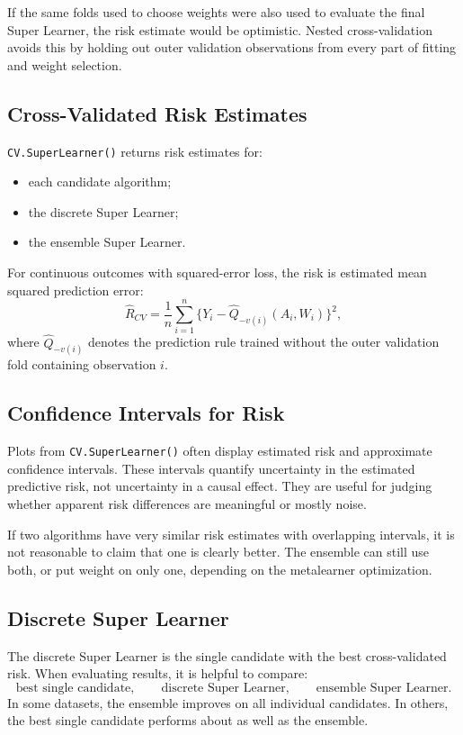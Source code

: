 If the same folds used to choose weights were also used to evaluate the final Super
Learner, the risk estimate would be optimistic. Nested cross-validation avoids this by
holding out outer validation observations from every part of fitting and weight
selection.

\subsection{Cross-Validated Risk Estimates}

\texttt{CV.SuperLearner()} returns risk estimates for:
\begin{itemize}
\item each candidate algorithm;
\item the discrete Super Learner;
\item the ensemble Super Learner.
\end{itemize}

For continuous outcomes with squared-error loss, the risk is estimated mean squared
prediction error:
\[
\widehat R_{CV}
=
\frac{1}{n}\sum_{i=1}^n
\{Y_i-\hat Q_{-v(i)}(A_i,W_i)\}^2,
\]
where $\hat Q_{-v(i)}$ denotes the prediction rule trained without the outer validation
fold containing observation $i$.

\subsection{Confidence Intervals for Risk}

Plots from \texttt{CV.SuperLearner()} often display estimated risk and approximate
confidence intervals. These intervals quantify uncertainty in the estimated predictive
risk, not uncertainty in a causal effect. They are useful for judging whether apparent
risk differences are meaningful or mostly noise.

If two algorithms have very similar risk estimates with overlapping intervals, it is not
reasonable to claim that one is clearly better. The ensemble can still use both, or put
weight on only one, depending on the metalearner optimization.

\subsection{Discrete Super Learner}

The discrete Super Learner is the single candidate with the best cross-validated risk.
When evaluating results, it is helpful to compare:
\[
\text{best single candidate},\qquad
\text{discrete Super Learner},\qquad
\text{ensemble Super Learner}.
\]
In some datasets, the ensemble improves on all individual candidates. In others, the
best single candidate performs about as well as the ensemble.

